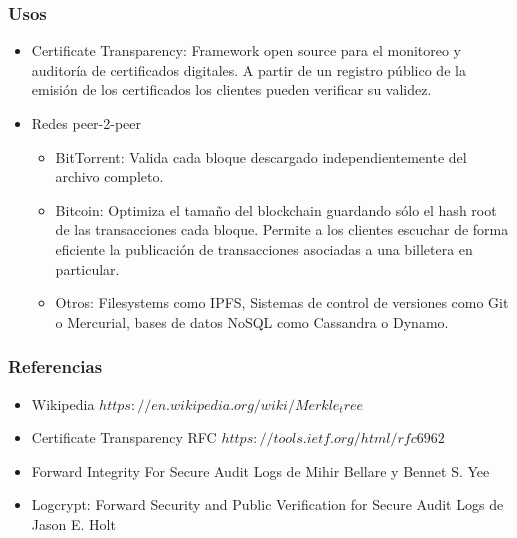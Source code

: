 \documentclass[10pt, a4paper,english,spanish]{beamer}
\begin{document}
\begin{frame}
\frametitle{Usos}

\begin{itemize}

\item Certificate Transparency: Framework open source para el monitoreo y auditor\'ia de certificados digitales. A partir de un registro p\'ublico de la emisi\'on de los certificados los clientes pueden verificar su validez.


\item Redes peer-2-peer
\begin{itemize}

\item BitTorrent: Valida cada bloque descargado independientemente del archivo completo.
\item Bitcoin: Optimiza el tama\~no del blockchain guardando s\'olo el hash root de las transacciones cada bloque. Permite a los clientes escuchar de forma eficiente la publicaci\'on de transacciones asociadas a una billetera en particular.
\item Otros: Filesystems como IPFS, Sistemas de control de versiones como Git o Mercurial, bases de datos NoSQL como Cassandra o Dynamo.


\end{itemize}

\end{itemize}


\end{frame}





\begin{frame}
\frametitle{Referencias}


\begin{itemize}

\item Wikipedia \(https://en.wikipedia.org/wiki/Merkle_tree\)
\item Certificate Transparency RFC \(https://tools.ietf.org/html/rfc6962\)
\item Forward Integrity For Secure Audit Logs de Mihir Bellare y Bennet S. Yee
\item Logcrypt: Forward Security and Public Verification for Secure Audit Logs de Jason E. Holt

\end{itemize}
\end{frame}
\end{document}
